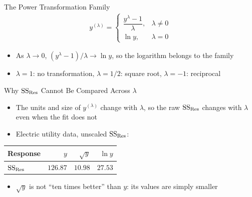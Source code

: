 \begin{frame}{The Power Transformation Family}
\begin{align*}
    y^{(\lambda)} =
    \begin{cases}
        \dfrac{y^\lambda - 1}{\lambda}, & \lambda \neq 0 \\[1ex]
        \ln y, & \lambda = 0
    \end{cases}
\end{align*}
\begin{itemize}
    \item As $\lambda \to 0$, $(y^\lambda - 1)/\lambda \to \ln y$, so the logarithm belongs to the family
    \item $\lambda = 1$: no transformation, $\lambda = 1/2$: square root, $\lambda = -1$: reciprocal
\end{itemize}
\end{frame}


\begin{frame}{Why $\mathrm{SS}_{\mathrm{Res}}$ Cannot Be Compared Across $\lambda$}
\begin{itemize}
    \item The units and size of $y^{(\lambda)}$ change with $\lambda$, so the raw $\mathrm{SS}_{\mathrm{Res}}$ changes with $\lambda$ even when the fit does not
    \item Electric utility data, unscaled $\mathrm{SS}_{\mathrm{Res}}$:
\end{itemize}
\begin{center}
{\renewcommand{\arraystretch}{1.2}
\small
\begin{tabular}{lrrr}
\toprule
Response & $y$ & $\sqrt{y}$ & $\ln y$ \\
\midrule
$\mathrm{SS}_{\mathrm{Res}}$ & $126.87$ & $10.98$ & $27.53$ \\
\bottomrule
\end{tabular}}
\end{center}
\begin{itemize}
    \item $\sqrt{y}$ is not ``ten times better'' than $y$: its values are simply smaller
\end{itemize}
\end{frame}


